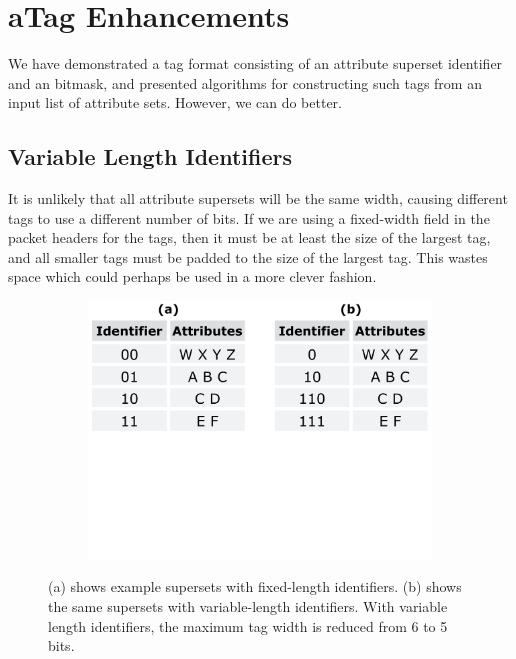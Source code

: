 \section{aTag Enhancements}
We have demonstrated a tag format consisting of an attribute superset identifier and an bitmask, and presented algorithms for constructing such tags from an input list of attribute sets. However, we can do better.


\subsection{Variable Length Identifiers}
It is unlikely that all attribute supersets will be the same width, causing different tags to use a different number of bits. If we are using a fixed-width field in the packet headers for the tags, then it must be at least the size of the largest tag, and all smaller tags must be padded to the size of the largest tag. This wastes space which could perhaps be used in a more clever fashion.

\begin{figure}[t!] 
\begin{minipage}{1\linewidth}
\begin{subfigure}[c]{0.96\linewidth}
\includegraphics[trim={0 10cm 0 0}, clip, width=\linewidth]{figures/variable_identifiers}
\end{subfigure} 
\end{minipage} 
\caption{(a) shows example supersets with fixed-length identifiers. (b) shows the same supersets with variable-length identifiers. With variable length identifiers, the maximum tag width is reduced from 6 to 5 bits. }
\label{fig:variable_id}
\end{figure}

